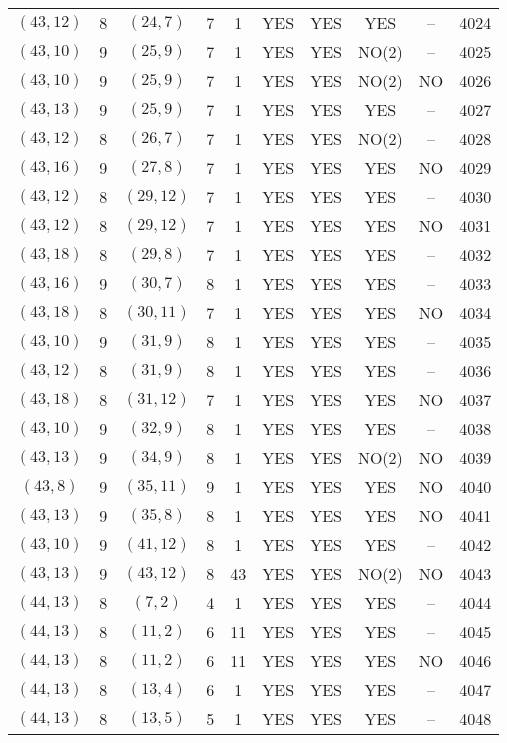 \begin{longtable}{|c|c|c|c|c|c|c|c|c|c|}
$(43, 12)$ & 8 & $(24, 7)$ & 7 & 1 & YES & YES & YES & -- & 4024\\
$(43, 10)$ & 9 & $(25, 9)$ & 7 & 1 & YES & YES & NO(2) & -- & 4025\\
$(43, 10)$ & 9 & $(25, 9)$ & 7 & 1 & YES & YES & NO(2) & NO & 4026\\
$(43, 13)$ & 9 & $(25, 9)$ & 7 & 1 & YES & YES & YES & -- & 4027\\
$(43, 12)$ & 8 & $(26, 7)$ & 7 & 1 & YES & YES & NO(2) & -- & 4028\\
$(43, 16)$ & 9 & $(27, 8)$ & 7 & 1 & YES & YES & YES & NO & 4029\\
$(43, 12)$ & 8 & $(29, 12)$ & 7 & 1 & YES & YES & YES & -- & 4030\\
$(43, 12)$ & 8 & $(29, 12)$ & 7 & 1 & YES & YES & YES & NO & 4031\\
$(43, 18)$ & 8 & $(29, 8)$ & 7 & 1 & YES & YES & YES & -- & 4032\\
$(43, 16)$ & 9 & $(30, 7)$ & 8 & 1 & YES & YES & YES & -- & 4033\\
$(43, 18)$ & 8 & $(30, 11)$ & 7 & 1 & YES & YES & YES & NO & 4034\\
$(43, 10)$ & 9 & $(31, 9)$ & 8 & 1 & YES & YES & YES & -- & 4035\\
$(43, 12)$ & 8 & $(31, 9)$ & 8 & 1 & YES & YES & YES & -- & 4036\\
$(43, 18)$ & 8 & $(31, 12)$ & 7 & 1 & YES & YES & YES & NO & 4037\\
$(43, 10)$ & 9 & $(32, 9)$ & 8 & 1 & YES & YES & YES & -- & 4038\\
$(43, 13)$ & 9 & $(34, 9)$ & 8 & 1 & YES & YES & NO(2) & NO & 4039\\
$(43, 8)$ & 9 & $(35, 11)$ & 9 & 1 & YES & YES & YES & NO & 4040\\
$(43, 13)$ & 9 & $(35, 8)$ & 8 & 1 & YES & YES & YES & NO & 4041\\
$(43, 10)$ & 9 & $(41, 12)$ & 8 & 1 & YES & YES & YES & -- & 4042\\
$(43, 13)$ & 9 & $(43, 12)$ & 8 & 43 & YES & YES & NO(2) & NO & 4043\\
$(44, 13)$ & 8 & $(7, 2)$ & 4 & 1 & YES & YES & YES & -- & 4044\\
$(44, 13)$ & 8 & $(11, 2)$ & 6 & 11 & YES & YES & YES & -- & 4045\\
$(44, 13)$ & 8 & $(11, 2)$ & 6 & 11 & YES & YES & YES & NO & 4046\\
$(44, 13)$ & 8 & $(13, 4)$ & 6 & 1 & YES & YES & YES & -- & 4047\\
$(44, 13)$ & 8 & $(13, 5)$ & 5 & 1 & YES & YES & YES & -- & 4048\\

\end{longtable}
